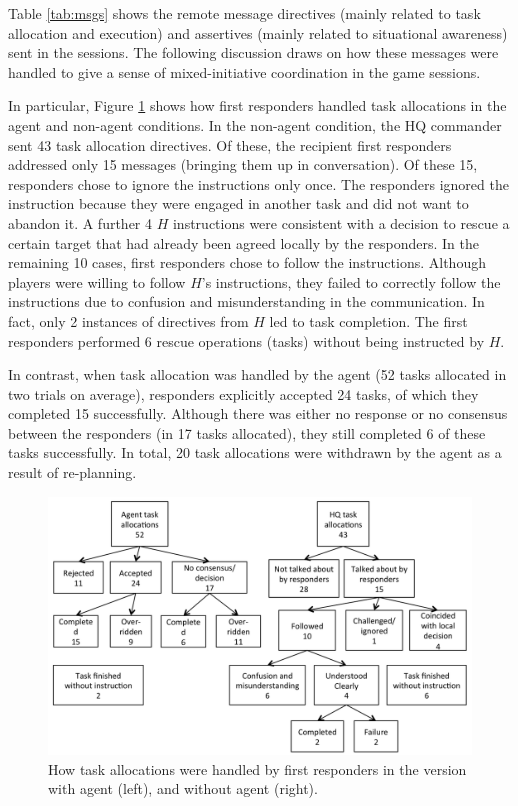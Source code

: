 Table \ref{tab:msgs} shows the remote message directives (mainly related to task allocation and execution) and assertives (mainly related to situational awareness) sent in the sessions. The following discussion draws on how these messages were handled to give a sense of mixed-initiative coordination in the game sessions.

In particular, Figure \ref{fig:msgs} shows how first responders handled task allocations in the agent and  non-agent conditions. In the non-agent condition, the HQ commander sent 43 task allocation directives. Of these, the recipient first responders addressed only 15 messages (bringing them up in conversation). Of these 15, responders chose to ignore the instructions only once. The responders ignored the instruction because they were engaged in another task and did not want to abandon it. A further 4 $H$ instructions were consistent with a decision to rescue a certain target that had already been agreed locally by the responders. In the remaining 10 cases, first responders chose to follow the instructions. Although players were willing to follow $H$'s instructions, they failed to correctly follow the instructions due to confusion and misunderstanding in the communication. In fact, only 2 instances of directives from $H$ led to task completion. The first responders performed 6 rescue operations (tasks) without being instructed by $H$.

In contrast, when task allocation was handled by the agent (52 tasks allocated in two trials on average), responders explicitly accepted 24 tasks,  of which they completed 15  successfully. Although there was either no response or no consensus between the responders (in 17 tasks allocated), they still completed 6 of these tasks successfully. In total, 20 task allocations were withdrawn by the agent as a result of re-planning. 

\begin{figure}[htbp]
\includegraphics[width=\columnwidth]{message_handling.png}
\vspace{-3mm}
\caption{How task allocations were handled by first responders in the version with agent (left), and without agent (right).\vspace{-1mm}}\label{fig:msgs}
\end{figure}


